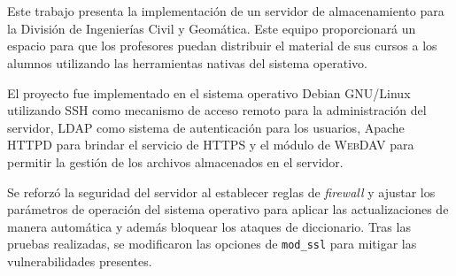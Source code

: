 \cleardoublepage  
\chapter*{\abstractname}
\label{chap:abstract}

{
\linespread{1.6}

Este trabajo presenta la implementaci\'{o}n de un servidor de almacenamiento para la Divisi\'{o}n de Ingenier\'{i}as Civil y Geom\'{a}tica. Este equipo proporcionar\'{a} un espacio para que los profesores puedan distribuir el material de sus cursos a los alumnos utilizando las herramientas nativas del sistema operativo.

El proyecto fue implementado en el sistema operativo Debian \textsc{GNU}/Linux utilizando \textsc{SSH} como mecanismo de acceso remoto para la administraci\'{o}n del servidor, \textsc{LDAP} como sistema de autenticaci\'{o}n para los usuarios, Apache \textsc{HTTPD} para brindar el servicio de \textsc{HTTPS} y el m\'{o}dulo de \textsc{WebDAV} para permitir la gesti\'{o}n de los archivos almacenados en el servidor.

Se reforz\'{o} la seguridad del servidor al establecer reglas de \emph{firewall} y ajustar los par\'{a}metros de operaci\'{o}n del sistema operativo para aplicar las actualizaciones de manera autom\'{a}tica y adem\'{a}s bloquear los ataques de diccionario. Tras las pruebas realizadas, se modificaron las opciones de \texttt{mod\_ssl} para mitigar las vulnerabilidades presentes.
}


